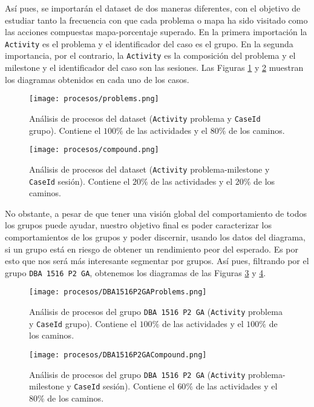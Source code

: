 Así pues, se importarán el dataset de dos maneras diferentes, con el objetivo de estudiar tanto la frecuencia con que cada problema o mapa ha sido visitado como las acciones compuestas mapa-porcentaje superado. En la primera importación la \texttt{Activity} es el problema y el identificador del caso es el grupo. En la segunda importancia, por el contrario, la \texttt{Activity} es la composición del problema y el milestone y el identificador del caso son las sesiones. Las Figuras \ref{fig:problems} y \ref{fig:compound} muestran los diagramas obtenidos en cada uno de los casos.

\begin{figure}[H]
    \centering
    \texttt{[image: procesos/problems.png]}
    \caption{Análisis de procesos del dataset (\texttt{Activity} problema y \texttt{CaseId} grupo). Contiene el $100\%$ de las actividades y el $80\%$ de los caminos.}
    \label{fig:problems}
\end{figure}

\begin{figure}[H]
    \centering
    \texttt{[image: procesos/compound.png]}
    \caption{Análisis de procesos del dataset (\texttt{Activity} problema-milestone y \texttt{CaseId} sesión). Contiene el $20\%$ de las actividades y el $20\%$ de los caminos.}
    \label{fig:compound}
\end{figure}

No obstante, a pesar de que tener una visión global del comportamiento de todos los grupos puede ayudar, nuestro objetivo final es poder caracterizar los comportamientos de los grupos y poder discernir, usando los datos del diagrama, si un grupo está en riesgo de obtener un rendimiento peor del esperado. Es por esto que nos será más interesante segmentar por grupos. Así pues, filtrando por el grupo \texttt{DBA 1516 P2 GA}, obtenemos los diagramas de las Figuras \ref{fig:problemsDBA1516P2GA} y \ref{fig:compoundDBA1516P2GA}.

\begin{figure}[H]
    \centering
    \texttt{[image: procesos/DBA1516P2GAProblems.png]}
    \caption{Análisis de procesos del grupo \texttt{DBA 1516 P2 GA} (\texttt{Activity} problema y \texttt{CaseId} grupo). Contiene el $100\%$ de las actividades y el $100\%$ de los caminos.}
    \label{fig:problemsDBA1516P2GA}
\end{figure}

\begin{figure}[H]
    \centering
    \texttt{[image: procesos/DBA1516P2GACompound.png]}
    \caption{Análisis de procesos del grupo \texttt{DBA 1516 P2 GA} (\texttt{Activity} problema-milestone y \texttt{CaseId} sesión). Contiene el $60\%$ de las actividades y el $80\%$ de los caminos.}
    \label{fig:compoundDBA1516P2GA}
\end{figure}

